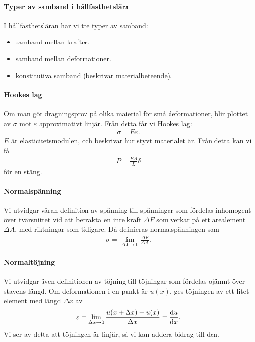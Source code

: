 \paragraph{Typer av samband i hållfasthetslära}
I hållfasthetsläran har vi tre typer av samband:
\begin{itemize}
	\item samband mellan krafter.
	\item samband mellan deformationer.
	\item konstitutiva samband (beskrivar materialbeteende).
\end{itemize}

\paragraph{Hookes lag}
Om man gör dragningsprov på olika material för små deformationer, blir plottet av $\sigma$ mot $\varepsilon$ approximativt linjär. Från detta får vi Hookes lag:
\begin{align*}
	\sigma = E\varepsilon.
\end{align*}
$E$ är elasticitetsmodulen, och beskrivar hur styvt materialet är. Från detta kan vi få
\begin{align*}
	P = \frac{EA}{L}\delta
\end{align*}
för en stång.

\paragraph{Normalspänning}
Vi utvidgar våran definition av spänning till spänningar som fördelas inhomogent över tvärsnittet vid att betrakta en inre kraft $\Delta F$ som verkar på ett arealement $\Delta A$, med riktningar som tidigare. Då definieras normalspänningen som
\begin{align*}
	\sigma = \lim\limits_{\Delta A\to 0}\frac{\Delta F}{\Delta A}.
\end{align*}

\paragraph{Normaltöjning}
Vi utvidgar även definitionen av töjning till töjningar som fördelas ojämnt över stavens längd. Om deformationen i en punkt är $u(x)$, ges töjningen av ett litet element med längd $\Delta x$ av
\begin{align*}
	\varepsilon = \lim\limits_{\Delta x\to 0}\frac{u(x + \Delta x) - u(x)}{\Delta x} = \dv{u}{x}.
\end{align*}
Vi ser av detta att töjningen är linjär, så vi kan addera bidrag till den.

